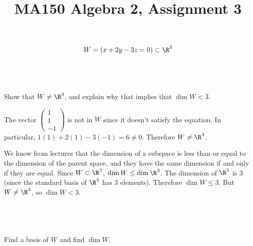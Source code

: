 \documentclass[a4paper]{article}
\title{MA150 Algebra 2, Assignment 3}
\begin{document}
\maketitle

\setlength{\parindent}{0em}
\setlength{\parskip}{1em}


\begin{questionbody}
\begin{equation}
W = (x + 2y - 3z = 0) \subset \R^3
\label{eqn:Q6-W}
\end{equation}
\end{questionbody}

\subsection{~} %

\begin{questionbody}
Show that $W \ne \R^3$, and explain why that implies that $\dim W < 3$.
\end{questionbody}

The vector $\begin{pmatrix}1 \\ 1 \\ -1\end{pmatrix}$ is not in $W$ since it doesn't satisfy the equation. In particular, $1(1) + 2(1) - 3(-1) = 6 \ne 0$. Therefore $W \ne \R^3$.

We know from lectures that the dimension of a subspace is less than or equal to the dimension of the parent space, and they have the same dimension if and only if they are equal. Since $W \subset \R^3$, $\dim W \le \dim \R^3$. The dimension of $\R^3$ is 3 (since the standard basis of $\R^3$ has 3 elements). Therefore $\dim W \le 3$. But $W \ne \R^3$, so $\dim W < 3$.

\subsection{~} %

\begin{questionbody}
Find a basis of $W$ and find $\dim W$.
\end{questionbody}
\end{document}
